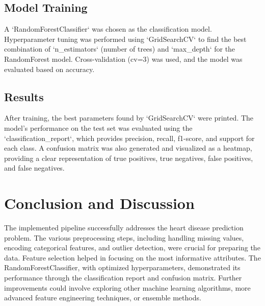 \documentclass{article}
\begin{document}
\subsection{Model Training}
A `RandomForestClassifier` was chosen as the classification model. Hyperparameter tuning was performed using `GridSearchCV` to find the best combination of `n_estimators` (number of trees) and `max_depth` for the RandomForest model. Cross-validation (cv=3) was used, and the model was evaluated based on accuracy.

\subsection{Results}
After training, the best parameters found by `GridSearchCV` were printed. The model's performance on the test set was evaluated using the `classification_report`, which provides precision, recall, f1-score, and support for each class. A confusion matrix was also generated and visualized as a heatmap, providing a clear representation of true positives, true negatives, false positives, and false negatives.

\section{Conclusion and Discussion}
The implemented pipeline successfully addresses the heart disease prediction problem. The various preprocessing steps, including handling missing values, encoding categorical features, and outlier detection, were crucial for preparing the data. Feature selection helped in focusing on the most informative attributes. The RandomForestClassifier, with optimized hyperparameters, demonstrated its performance through the classification report and confusion matrix. Further improvements could involve exploring other machine learning algorithms, more advanced feature engineering techniques, or ensemble methods.
\end{document}
